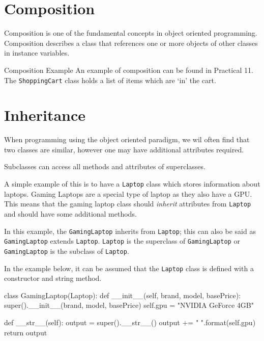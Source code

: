 
\section*{Composition}
Composition is one of the fundamental concepts in object oriented programming. Composition describes a class that references one or more objects of other classes in instance variables.
\begin{link}{Composition Example}
An example of composition can be found in Practical 11. The \texttt{ShoppingCart} class holds a list of items which are `in' the cart. 
\end{link}

\section*{Inheritance}
When programming using the object oriented paradigm, we wil often find that two classes are similar, however one may have additional attributes required. 

Subclasses can access all methods and attributes of superclasses. 

A simple example of this is to have a \texttt{Laptop} class which stores information about laptops. Gaming Laptops are a special type of laptop as they also have a GPU. This means that the gaming laptop class should \textit{inherit} attributes from \texttt{Laptop} and should have some additional methods.

In this example, the \texttt{GamingLaptop} inherits from \texttt{Laptop}; this can also be said as \texttt{GamingLaptop} extends \texttt{Laptop}. \texttt{Laptop} is the superclass of \texttt{GamingLaptop} or \texttt{GamingLaptop} is the subclass of \texttt{Laptop}. 

In the example below, it can be assumed that the \texttt{Laptop} class is defined with a constructor and string method.
\begin{python}
class GamingLaptop(Laptop):
    def __init__(self, brand, model, basePrice):
        super().__init__(brand, model, basePrice)
        self.gpu = "NVIDIA GeForce 4GB"

    def __str__(self):
        output = super().__str__()
        output += " {}".format(self.gpu)
        return output
\end{python}